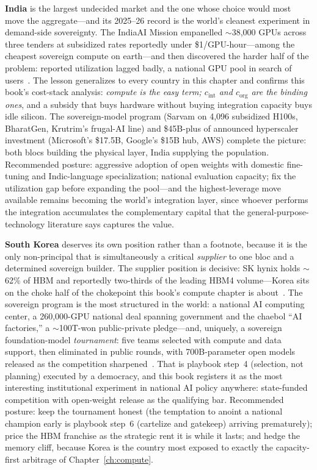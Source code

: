 \textbf{India} is the largest undecided market and the one whose choice would most move the aggregate---and its 2025--26 record is the world's cleanest experiment in demand-side sovereignty. The IndiaAI Mission empanelled $\sim$38{,}000 GPUs across three tenders at subsidized rates reportedly under \$1/GPU-hour---among the cheapest sovereign compute on earth---and then discovered the harder half of the problem: reported utilization lagged badly, a national GPU pool in search of users~\cite{indiaai}. The lesson generalizes to every country in this chapter and confirms this book's cost-stack analysis: \emph{compute is the easy term; $c_{\mathrm{int}}$ and $c_{\mathrm{org}}$ are the binding ones}, and a subsidy that buys hardware without buying integration capacity buys idle silicon. The sovereign-model program (Sarvam on 4{,}096 subsidized H100s, BharatGen, Krutrim's frugal-AI line) and \$45B-plus of announced hyperscaler investment (Microsoft's \$17.5B, Google's \$15B hub, AWS) complete the picture: both blocs building the physical layer, India supplying the population. Recommended posture: aggressive adoption of open weights with domestic fine-tuning and Indic-language specialization; national evaluation capacity; fix the utilization gap before expanding the pool---and the highest-leverage move available remains becoming the world's integration layer, since whoever performs the integration accumulates the complementary capital that the general-purpose-technology literature says captures the value.

\textbf{South Korea} deserves its own position rather than a footnote, because it is the only non-principal that is simultaneously a critical \emph{supplier} to one bloc and a determined sovereign builder. The supplier position is decisive: SK hynix holds $\sim$62\% of HBM and reportedly two-thirds of the leading HBM4 volume---Korea sits on the choke half of the chokepoint this book's compute chapter is about~\cite{korea-hbm}. The sovereign program is the most structured in the world: a national AI computing center, a 260{,}000-GPU national deal spanning government and the chaebol ``AI factories,'' a $\sim$100T-won public-private pledge---and, uniquely, a sovereign foundation-model \emph{tournament}: five teams selected with compute and data support, then eliminated in public rounds, with 700B-parameter open models released as the competition sharpened~\cite{korea-sovereign}. That is playbook step~4 (selection, not planning) executed by a democracy, and this book registers it as the most interesting institutional experiment in national AI policy anywhere: state-funded competition with open-weight release as the qualifying bar. Recommended posture: keep the tournament honest (the temptation to anoint a national champion early is playbook step~6 (cartelize and gatekeep) arriving prematurely); price the HBM franchise as the strategic rent it is while it lasts; and hedge the memory cliff, because Korea is the country most exposed to exactly the capacity-first arbitrage of Chapter~\ref{ch:compute}.

